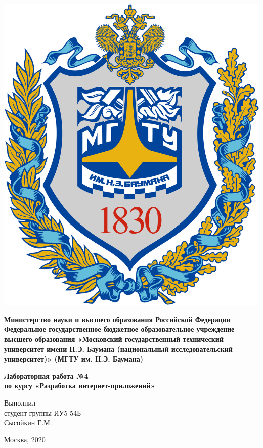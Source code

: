 \documentclass[20pt,a4paper]{report}
\begin{document}
	\begin{titlepage}
		\begin{minipage}{0.3\textwidth}
		\includegraphics[scale=0.03]{logo.png}	
		\end{minipage}
		\begin{minipage}{0.6\textwidth}\centering
			\textbf{
				Министерство науки и высшего образования Российской Федерации
				Федеральное государственное бюджетное образовательное 
				учреждение высшего образования
				«Московский государственный технический университет
				имени Н.Э. Баумана (национальный исследовательский университет)»
				(МГТУ им. Н.Э. Баумана)
			}	
		\end{minipage}
	
		\vspace{5cm}
		\centering
		\Large
		\textbf{
			Лабораторная работа №4 \\
			по курсу «Разработка интернет-приложений» \\
		}

		\vspace{6cm}
		\begin{flushright}
			Выполнил \\ 
			студент группы ИУ5-54Б \\ 
			Сысойкин Е.М. 
		\end{flushright}
		\vspace{5cm}
		Москва, 2020
	\end{titlepage}
\end{document}
